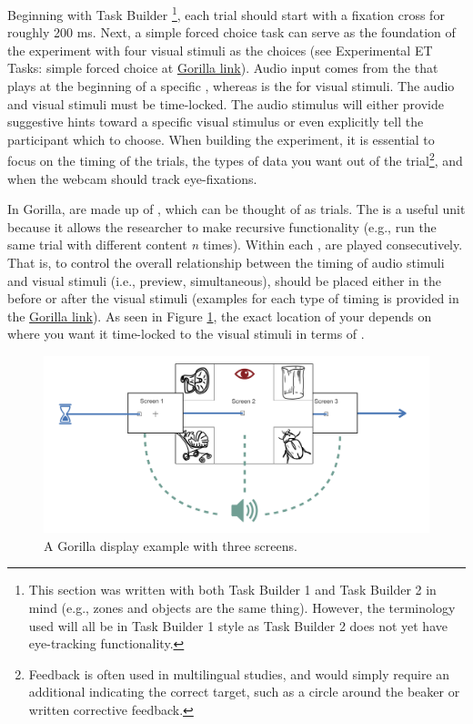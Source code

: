 Beginning with Task Builder \footnote{This section was written with both Task Builder 1 and Task Builder 2 in mind (e.g., zones and objects are the same thing). However, the terminology used will all be in Task Builder 1 style as Task Builder 2 does not yet have eye-tracking functionality.}, each trial should start with a fixation cross for roughly 200 ms. Next, a simple forced choice task can serve as the foundation of the experiment with four visual stimuli as the choices (see Experimental ET Tasks: simple forced choice at \href{https://app.gorilla.sc/openmaterials/715241}{Gorilla link}). Audio input comes from the   that plays at the beginning of a specific , whereas  is the  for visual stimuli. The audio and visual stimuli must be time-locked. The audio stimulus will either provide suggestive hints toward a specific visual stimulus or even explicitly tell the participant which to choose. When building the experiment, it is essential to focus on the timing of the trials, the types of data you want out of the trial\footnote{Feedback is often used in multilingual studies, and would simply require an additional  indicating the correct target, such as a circle around the beaker or written corrective feedback.}, and when the webcam should track eye-fixations. 

In Gorilla,  are made up of , which can be thought of as trials. The  is a useful unit because it allows the researcher to make recursive functionality (e.g., run the same trial with different content \textit{n} times). Within each ,   are played consecutively. That is, to control the overall relationship between the timing of audio stimuli and visual stimuli (i.e., preview, simultaneous),  should be placed either in the  before or after the visual stimuli (examples for each type of timing is provided in the \href{https://app.gorilla.sc/openmaterials/715241}{Gorilla link}). As seen in Figure \ref{fig:Gorilla_work_flow}, the exact location of your  depends on where you want it time-locked to the visual stimuli in terms of . 

\begin{figure}[h]
    \centering
    \includegraphics[scale=.5]{figures/Gorilla_work_flow.png}
    \caption{A Gorilla display example with three screens.}
    \label{fig:Gorilla_work_flow}
\end{figure}

